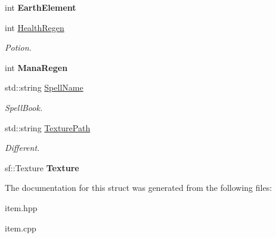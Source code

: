 \begin{DoxyCompactItemize}
int {\bfseries Earth\+Element}
\item 
\mbox{\label{structtfp_1_1_item_stats_af03f68b3ea4f0678a772379016adb942}} 
int \mbox{\hyperlink{structtfp_1_1_item_stats_af03f68b3ea4f0678a772379016adb942}{Health\+Regen}}
\begin{DoxyCompactList}\small\item\em Potion. \end{DoxyCompactList}\item 
\mbox{\label{structtfp_1_1_item_stats_a35f9eba4111528301546ab258d60a1ef}} 
int {\bfseries Mana\+Regen}
\item 
\mbox{\label{structtfp_1_1_item_stats_a780a3584ea7aecac4fbdad933dc5fa47}} 
std\+::string \mbox{\hyperlink{structtfp_1_1_item_stats_a780a3584ea7aecac4fbdad933dc5fa47}{Spell\+Name}}
\begin{DoxyCompactList}\small\item\em Spell\+Book. \end{DoxyCompactList}\item 
\mbox{\label{structtfp_1_1_item_stats_a7eb63021d99417e8747f310a61030015}} 
std\+::string \mbox{\hyperlink{structtfp_1_1_item_stats_a7eb63021d99417e8747f310a61030015}{Texture\+Path}}
\begin{DoxyCompactList}\small\item\em Different. \end{DoxyCompactList}\item 
\mbox{\label{structtfp_1_1_item_stats_ab2fd06f282c3d85b329258bee502fdb1}} 
sf\+::\+Texture {\bfseries Texture}
\end{DoxyCompactItemize}


The documentation for this struct was generated from the following files\+:\begin{DoxyCompactItemize}
\item 
item.\+hpp\item 
item.\+cpp\end{DoxyCompactItemize}
